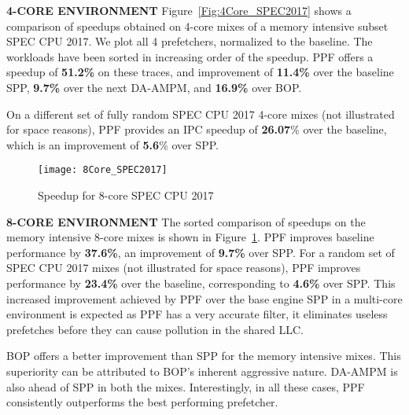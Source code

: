 \noindent \textbf{4-CORE ENVIRONMENT}
\newline
Figure~\ref{Fig:4Core_SPEC2017} shows a comparison of speedups obtained on
4-core mixes of a memory intensive subset SPEC CPU 2017. We plot all 4
prefetchers, normalized to the baseline. The workloads have been sorted in
increasing order of the speedup. PPF offers a speedup of \textbf{51.2\%} on
these traces, and improvement of \textbf{11.4\%} over the baseline SPP,
\textbf{9.7\%} over the next DA-AMPM, and \textbf{16.9\%} over BOP.

On a different set of fully random SPEC CPU 2017 4-core mixes (not illustrated
for space reasons), PPF provides an IPC speedup of \textbf{26.07}\% over the
baseline, which is an improvement of \textbf{5.6}\% over SPP.


\begin{figure}[ht]
\texttt{[image: 8Core\_SPEC2017]}
\caption{Speedup for 8-core SPEC CPU 2017}
\label{Fig:8Core_SPEC2017}
\end{figure}

\noindent \textbf{8-CORE ENVIRONMENT}
\newline
The sorted comparison of speedups on the memory intensive 8-core mixes is
shown in Figure~\ref{Fig:8Core_SPEC2017}. PPF improves baseline performance
by \textbf{37.6\%}, an improvement of \textbf{9.7\%} over SPP. For a random
set of SPEC CPU 2017 mixes (not illustrated for space reasons), PPF improves
performance by \textbf{23.4\%} over the baseline, corresponding to
\textbf{4.6\%} over SPP. This increased improvement achieved by PPF over the
base engine SPP in a multi-core environment is expected as PPF has a very
accurate filter, it eliminates useless prefetches before they can cause
pollution in the shared LLC.

BOP offers a better improvement than SPP for the memory intensive mixes. This
superiority can be attributed to BOP's inherent aggressive nature. DA-AMPM is
also ahead of SPP in both the mixes. Interestingly, in all these cases, PPF
consistently outperforms the best performing prefetcher.


